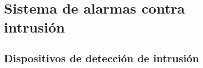 






\newpage

\section{Sistema de alarmas contra intrusión}


\subsection{Dispositivos de detección de intrusión}

